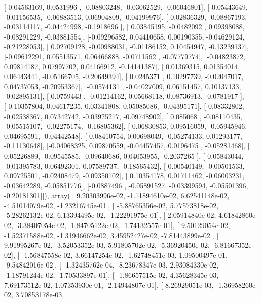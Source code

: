 \documentclass{article}
\begin{document}
       [ 0.04563169,  0.0531996 , -0.08803248, -0.03062529, -0.06046801],
       [-0.05443649, -0.01156535, -0.06883513,  0.06904809, -0.04199976],
       [-0.02836329, -0.08867193, -0.03114117, -0.04424998, -0.1918696 ],
       [ 0.03845195, -0.0482092 ,  0.09398088, -0.08291229, -0.03881554],
       [-0.09296582,  0.04410658,  0.00190355, -0.04629124, -0.21228053],
       [ 0.02709128, -0.00988031, -0.01186152,  0.10454947, -0.13239137],
       [-0.09612291,  0.05513571,  0.06466888, -0.0711562 , -0.07779774],
       [-0.04823872,  0.09814187,  0.07997702,  0.04166912, -0.14141387],
       [ 0.01369315,  0.01354014,  0.06443441, -0.05166705, -0.20649394],
       [ 0.0245371 ,  0.10297739, -0.02047017,  0.04737053, -0.20953367],
       [-0.0574131 , -0.04027009,  0.06151457,  0.10137133, -0.02895131],
       [-0.0759443 , -0.01214162,  0.05668118,  0.08736913, -0.0781917 ],
       [-0.10357804,  0.04617235,  0.03341808,  0.05085086, -0.04395171],
       [ 0.08332802, -0.02538367,  0.07342742, -0.03925217, -0.09748902],
       [ 0.085068  , -0.08110435, -0.05515107, -0.02275174, -0.16805362],
       [-0.06830853,  0.09516059, -0.05945946,  0.04695591, -0.04442548],
       [ 0.08410754,  0.00698049, -0.05274133,  0.01293177, -0.11130648],
       [-0.04068325,  0.09870559, -0.04457457,  0.0196475 , -0.05281468],
       [ 0.05226889, -0.09545585, -0.09640686,  0.04053955, -0.2037265 ],
       [ 0.05843044, -0.01395783,  0.06492301,  0.07589737, -0.18565432],
       [ 0.00540149, -0.00501533,  0.09725501, -0.02408479, -0.09350102],
       [ 0.10354178,  0.01711462, -0.06003231, -0.03642289, -0.05851776],
       [-0.0887496 , -0.05891527, -0.03399594, -0.05501396, -0.20181301]]), array([[  9.20303996e-02,  -1.11894610e-02,   6.62541148e-02,
         -4.51014079e-02,  -1.23216745e-01],
       [ -5.88765356e-02,   5.77573818e-02,  -5.28262132e-02,
          6.13394495e-02,  -1.22291975e-01],
       [  2.05914840e-02,   4.61842860e-02,  -3.38407054e-02,
         -1.84705122e-02,  -1.74132557e-01],
       [  9.50129054e-02,  -1.52371588e-02,  -1.31946662e-02,
          3.45952427e-02,  -7.81443899e-02],
       [  9.91995267e-02,  -3.52053352e-03,   5.91805702e-02,
         -5.36920450e-02,  -6.81667352e-02],
       [ -1.56847558e-02,   3.66147254e-02,  -1.62748451e-03,
          1.09500497e-01,  -9.54842016e-02],
       [ -1.32435762e-04,  -8.23678347e-03,   2.93084330e-02,
         -1.18791244e-02,  -1.70533897e-01],
       [ -1.86657515e-02,   4.35628345e-03,   7.69173512e-02,
          1.07353930e-01,  -2.14944807e-01],
       [  8.26929051e-03,  -1.36958260e-02,   3.70853178e-03,
\end{document}
